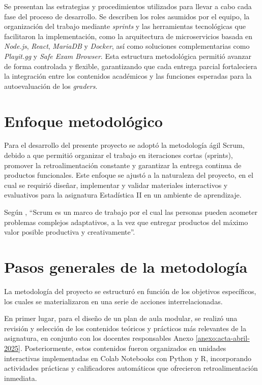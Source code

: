 \documentclass[letter,oneside,12pt,spanish]{report}
\begin{document}
Se presentan las estrategias y procedimientos utilizados para llevar a cabo cada fase del proceso de desarrollo. Se describen los roles asumidos por el equipo, la organización del trabajo mediante \textit{sprints} y las herramientas tecnológicas que facilitaron la implementación, como la arquitectura de microservicios basada en \textit{Node.js}, \textit{React}, \textit{MariaDB} y \textit{Docker}, así como soluciones complementarias como \textit{Playit.gg} y \textit{Safe Exam Browser}. Esta estructura metodológica permitió avanzar de forma controlada y flexible, garantizando que cada entrega parcial fortaleciera la integración entre los contenidos académicos y las funciones esperadas para la autoevaluación de los \textit{graders}.


\section{Enfoque metodológico}

Para el desarrollo del presente proyecto se adoptó la metodología ágil Scrum, debido a que permitió organizar el trabajo en iteraciones cortas (sprints), promover la retroalimentación constante y garantizar la entrega continua de productos funcionales. Este enfoque se ajustó a la naturaleza del proyecto, en el cual se requirió diseñar, implementar y validar materiales interactivos y evaluativos para la asignatura Estadística II en un ambiente de aprendizaje.

Según \cite{schwaber2013scrum}, ``Scrum es un marco de trabajo por el cual las personas pueden acometer problemas complejos adaptativos, a la vez que entregar productos del máximo valor posible productiva y creativamente''.

\section{Pasos generales de la metodología}

La metodología del proyecto se estructuró en función de los objetivos específicos, los cuales se materializaron en una serie de acciones interrelacionadas.

En primer lugar, para el diseño de un plan de aula modular, se realizó una revisión y selección de los contenidos teóricos y prácticos más relevantes de la asignatura, en conjunto con los docentes responsables Anexo \ref{anexo:acta-abril-2025}. Posteriormente, estos contenidos fueron organizados en unidades interactivas implementadas en Colab Notebooks con Python y R, incorporando actividades prácticas y calificadores automáticos que ofrecieron retroalimentación inmediata.
\end{document}
